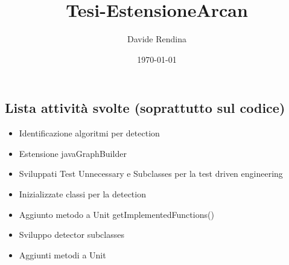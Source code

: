 \documentclass{article}
\title{Tesi-EstensioneArcan}
\author{Davide Rendina}
\date{\today}
\begin{document}
\maketitle

\newpage
\subsection{Lista attività svolte (soprattutto sul codice)}
\begin{itemize}
    \item Identificazione algoritmi per detection
    \item Estensione javaGraphBuilder
    \item Sviluppati Test Unnecessary e Subclasses per la test driven engineering
    \item Inizializzate classi per la detection
    \item Aggiunto metodo a Unit getImplementedFunctions()
    \item Sviluppo detector subclasses
    \item Aggiunti metodi a Unit
\end{itemize}{}


\newpage


\newpage



\end{document}
